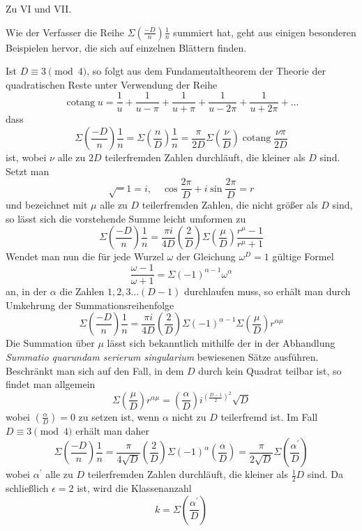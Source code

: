 \begin{center}\large Zu VI und VII.\end{center}

Wie der Verfasser die Reihe $\Sigma\left(\frac{-D}n\right)\frac1n$ summiert hat, geht aus einigen besonderen Beispielen hervor, die sich auf einzelnen Blättern finden.

Ist $D\equiv3\pmod4$, so folgt aus dem Fundamentaltheorem der Theorie der quadratischen Reste unter Verwendung der Reihe
\[
\operatorname{cotang}u=\frac1u+\frac1{u-\pi}+\frac1{u+\pi}+\frac1{u-2\pi}+\frac1{u+2\pi}+\ldots
\]
dass
\[
\Sigma\left(\frac{-D}n\right)\frac1n=\Sigma\left(\frac nD\right)\frac1n=\frac\pi{2D}\Sigma\left(\frac\nu D\right)\operatorname{cotang}\frac{\nu\pi}{2D}
\]
ist, wobei $\nu$ alle zu $2D$ teilerfremden Zahlen durchläuft, die kleiner als $D$ sind. Setzt man
\[
\surd-1=i,\quad\cos\frac{2\pi}D+i\sin\frac{2\pi}D=r
\]
und bezeichnet mit $\mu$ alle zu $D$ teilerfremden Zahlen, die nicht größer als $D$ sind, so lässt sich die vorstehende Summe leicht umformen zu
\[
\Sigma\left(\frac{-D}n\right)\frac1n=\frac{\pi i}{4D}\left(\frac2D\right)\Sigma\left(\frac\mu D\right)\frac{r^\mu-1}{r^\mu+1}
\]
Wendet man nun die für jede Wurzel $\omega$ der Gleichung $\omega^D=1$ gültige Formel
\[
\frac{\omega-1}{\omega+1}=\Sigma(-1)^{\alpha-1}\omega^\alpha
\]
an, in der $\alpha$ die Zahlen $1,2,3\ldots(D-1)$ durchlaufen muss, so erhält man durch Umkehrung der Summationsreihenfolge
\[
\Sigma\left(\frac{-D}n\right)\frac1n=\frac{\pi i}{4D}\left(\frac2D\right)\Sigma(-1)^{\alpha-1}\Sigma\left(\frac\mu D\right)r^{\alpha\mu}
\]
Die Summation über $\mu$ lässt sich bekanntlich mithilfe der in der Abhandlung \emph{Summatio quarundam serierum singularium} bewiesenen Sätze ausführen. Beschränkt man sich auf den Fall, in dem $D$ durch kein Quadrat teilbar ist, so findet man allgemein
\begingroup{}
\[
\Sigma\left(\frac\mu D\right)r^{\alpha\mu}=\left(\frac\alpha D\right)i^{\left(\frac{D-1}2\right)^2}\surd D
\]
\endgroup
wobei $\left(\frac\alpha D\right)=0$ zu setzen ist, wenn $\alpha$ nicht zu $D$ teilerfremd ist. Im Fall $D\equiv3\pmod4$ erhält man daher
\begingroup{}
\[
\Sigma\left(\frac{-D}n\right)\frac1n=\frac\pi{4\surd D}\left(\frac2D\right)\Sigma(-1)^\alpha\left(\frac\alpha D\right)=\frac\pi{2\surd D}\Sigma\left(\frac{\alpha^{\prime}}D\right)
\]
wobei $\alpha^{\prime}$ alle zu $D$ teilerfremden Zahlen durchläuft, die kleiner als $\frac12D$ sind. Da schließlich $\epsilon=2$ ist, wird die Klassenanzahl
\[
k=\Sigma\left(\frac{\alpha^{\prime}}D\right)
\]
\endgroup

